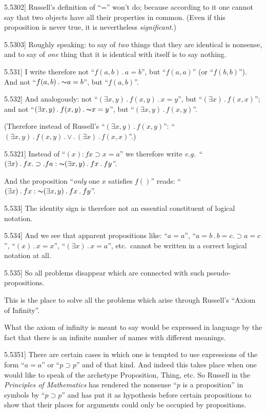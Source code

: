 \documentclass[12pt,oneside]{book}[2007/10/19]
\newcommand{\PropositionE}[2]{%
  \item[\phantomsection\label{PropE:#1}\PropGRef{#1}] #2%
}
\newcommand{\PropGRef}[1]{\hyperref[PropG:#1]{#1}}
\newcommand{\Not}[1]{\mathord{\thicksim} #1}
\newcommand{\DotOp}{\mathbin{.}}
\newcommand{\Implies}{\supset}
\newcommand{\BookTitle}[1]{\emph{#1}}
\newcommand{\exempliGratia}{\textit{e.g.}}
\begin{document}
\begin{propositions}
\PropositionE{5.5302}
{Russell's definition of ``='' won't do; because
according to it one cannot say that two objects
have all their properties in common. (Even if
this proposition is never true, it is nevertheless
\emph{significant}.)}


\PropositionE{5.5303}
{Roughly speaking: to say of \emph{two} things that
they are identical is nonsense, and to say of \emph{one}
thing that it is identical with itself is to say
nothing.}


\PropositionE{5.531}
{I write therefore not ``$f(a,b) \DotOp a = b$'', but ``$f(a,a)$''
(or ``$f(b,b)$''). And not ``$f(a,b) \DotOp \Not{a} = b$'', but
``$f(a,b)$''.}


\PropositionE{5.532}
{And analogously: not ``$(\exists x,y) \DotOp f(x,y) \DotOp x = y$'',
but ``$(\exists x) \DotOp f(x,x)$''; and not ``$(\exists x,y) \DotOp f(x,y) \DotOp
\Not{x} = y$'', but ``$(\exists x,y) \DotOp f(x,y)$''.

(Therefore instead of Russell's ``$(\exists x,y) \DotOp f(x,y)$'':
``$(\exists x,y) \DotOp f(x,y) \DotOp \lor \DotOp (\exists x) \DotOp f(x,x)$''.)}


\PropositionE{5.5321}
{Instead of ``$(x) : fx \Implies x = a$'' we therefore write
\exempliGratia\ ``$(\exists x) \DotOp fx \DotOp \Implies \DotOp fa : \Not{(\exists x,y) \DotOp fx \DotOp fy}$''.

And the proposition ``\emph{only} one $x$ satisfies $f()$''
reads: ``$(\exists x) \DotOp fx : \Not{(\exists x,y) \DotOp fx \DotOp fy}$''.}


\PropositionE{5.533}
{The identity sign is therefore not an essential
constituent of logical notation.}


\PropositionE{5.534}
{And we see that apparent propositions like:
``$a = a$'', ``$a = b \DotOp b = c \DotOp \Implies a = c$'', ``$(x) \DotOp x = x$'', ``$(\exists x) \DotOp
x = a$'', etc.\ cannot be written in a correct logical
notation at all.}


\PropositionE{5.535}
{So all problems disappear which are connected
with such pseu\-do-prop\-o\-si\-tions.

This is the place to solve all the problems which
arise through Russell's ``Axiom of Infinity''.

What the axiom of infinity is meant to say
would be expressed in language by the fact that
there is an infinite number of names with different
meanings.}


\PropositionE{5.5351}
{There are certain cases in which one is tempted
to use expressions of the form ``$a = a$'' or ``$p \Implies p$''
and of that kind. And indeed this takes place
when one would like to speak of the archetype
Proposition, Thing, etc. So Russell in the \BookTitle{Principles
of Mathematics} has rendered the nonsense ``$p$
is a proposition'' in symbols by ``$p \Implies p$'' and has
put it as hypothesis before certain propositions to
show that their places for arguments could only
be occupied by propositions.

}
\end{propositions}
\end{document}
